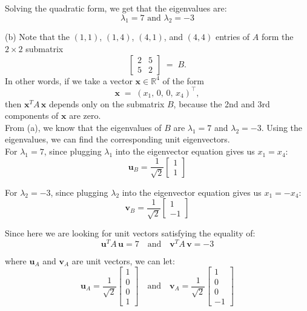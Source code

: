 \documentclass{article}
\begin{document}
Solving the quadratic form, we get that the eigenvalues are:
\[\lambda_1 = 7 \text{ and } \lambda_2 = -3\]

(b) Note that the \((1,1)\), \((1,4)\), \((4,1)\), and \((4,4)\) entries of \(A\) form the \(2\times 2\) submatrix
\[
\begin{bmatrix}
2 & 5 \\[6pt]
5 & 2
\end{bmatrix}
\;=\;
B.
\]
In other words, if we take a vector \(\mathbf{x}\in\mathbb{R}^4\) of the form
\[
\mathbf{x} \;=\; (x_1,\,0,\,0,\,x_4)^\top,
\]
then
\(\mathbf{x}^T A \,\mathbf{x}\) depends only on the submatrix \(B\), because the 2nd and 3rd components of \(\mathbf{x}\) are zero. \\

From (a), we know that the eigenvalues of \(B\) are \(\lambda_1 = 7\) and \(\lambda_2 = -3\). Using the eigenvalues, we can find the corresponding unit eigenvectors. \\

For \(\lambda_1 = 7\), since plugging $\lambda_1$ into the eigenvector equation gives us $x_1 = x_4$:
\[
\mathbf{u}_B = \frac{1}{\sqrt{2}}\begin{bmatrix} 1 \\ 1 \end{bmatrix}
\]

For \(\lambda_2 = -3\), since plugging $\lambda_2$ into the eigenvector equation gives us $x_1 = -x_4$:
\[
\mathbf{v}_B = \frac{1}{\sqrt{2}}\begin{bmatrix} 1 \\ -1 \end{bmatrix}
\]

Since here we are looking for unit vectors satisfying the equality of:
\[
\mathbf{u}^T A \,\mathbf{u} = 7 \quad \text{and} \quad \mathbf{v}^T A \,\mathbf{v} = -3
\]

where \(\mathbf{u}_A\) and \(\mathbf{v}_A\) are unit vectors, we can let:
\[
\mathbf{u}_A = \frac{1}{\sqrt{2}}\begin{bmatrix} 1 \\ 0 \\ 0 \\ 1 \end{bmatrix} \quad \text{and} \quad \mathbf{v}_A = \frac{1}{\sqrt{2}}\begin{bmatrix} 1 \\ 0 \\ 0 \\ -1 \end{bmatrix}
\]
\end{document}
